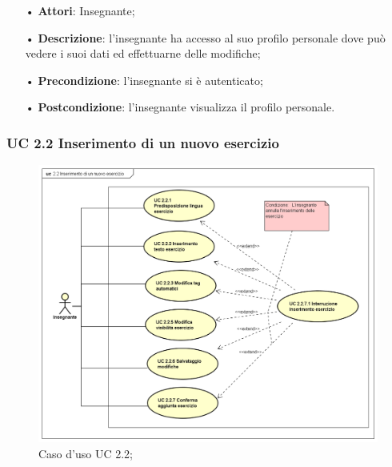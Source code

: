 \begin{itemize}
	\item[•] \textbf{Attori}: Insegnante;
	\item[•] \textbf{Descrizione}: l'insegnante ha accesso al suo profilo personale dove può vedere i suoi dati ed effettuarne delle modifiche;
	\item[•] \textbf{Precondizione}: l'insegnante si è autenticato;
	\item[•] \textbf{Postcondizione}: l'insegnante visualizza il profilo personale.

\end{itemize}


\subsubsection{UC 2.2 Inserimento di un nuovo esercizio}



\begin{figure}[H]
	\centering
	\includegraphics[width=17cm]{img/UC22SISTEMA.png} 
	\caption{Caso d'uso UC 2.2;}
\end{figure}

